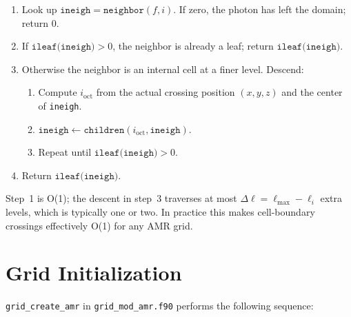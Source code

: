 \documentclass[english,a4paper]{my_memo}
\begin{document}
\begin{enumerate}
  \item Look up $\texttt{ineigh} = \texttt{neighbor}(f, i)$.  If zero, the photon
        has left the domain; return 0.
  \item If $\texttt{ileaf(ineigh)} > 0$, the neighbor is already a leaf; return
        $\texttt{ileaf(ineigh)}$.
  \item Otherwise the neighbor is an internal cell at a finer level.  Descend:
        \begin{enumerate}
          \item Compute $i_\mathrm{oct}$ from the actual crossing position
                $(x, y, z)$ and the center of \texttt{ineigh}.
          \item $\texttt{ineigh} \leftarrow \texttt{children}(i_\mathrm{oct}, \texttt{ineigh})$.
          \item Repeat until $\texttt{ileaf(ineigh)} > 0$.
        \end{enumerate}
  \item Return $\texttt{ileaf(ineigh)}$.
\end{enumerate}

Step~1 is O(1); the descent in step~3 traverses at most
$\Delta\ell = \ell_\mathrm{max} - \ell_i$ extra levels, which is typically
one or two.  In practice this makes cell-boundary crossings effectively O(1)
for any AMR grid.

\section{Grid Initialization}

\texttt{grid\_create\_amr} in \texttt{grid\_mod\_amr.f90} performs the
following sequence:
\end{document}
